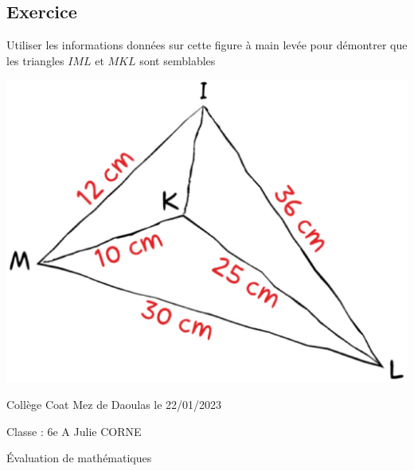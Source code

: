\documentclass[a4paper,12pt,fleqn]{article}
\newcounter{exo}          				%
\newcommand{\exo}{					%
  	\stepcounter{exo}        			%
  	\subsection*{Exercice \no{}\theexo}}
\begin{document}
\vspace{0.5cm}

\medskip
\begin{minipage}{0.99\linewidth}

\exo

\begin{multicols}{2}
Utiliser les informations données sur cette figure à main levée pour démontrer que les triangles $IML$ et $MKL$ sont semblables

\begin{center}

\includegraphics[scale=.18]{items/MathsP4C42.eps}

\end{center}

\end{multicols}

\end{minipage}

\vspace{0.5cm}

\medskip
\newpage
\setcounter{exo}{0}


Collège Coat Mez de Daoulas  \hfill  le 22/01/2023

Classe : 6e A \hfill Julie CORNE

\begin{center}
\begin{LARGE} Évaluation de mathématiques \end{LARGE}
\end{center}
\end{document}
